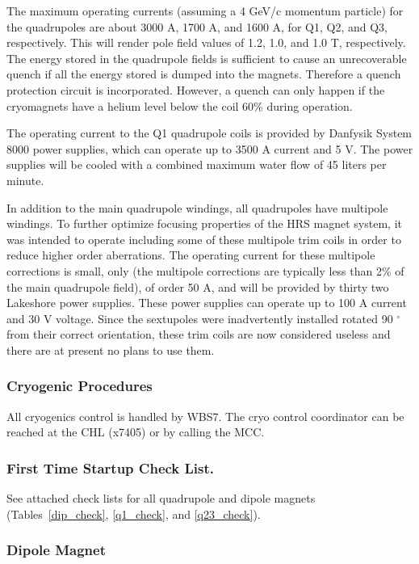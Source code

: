 The maximum operating currents (assuming a 4 GeV/c momentum particle) 
for the quadrupoles are about 3000 A, 1700 A, and 1600 A, for Q1, Q2, and 
Q3, respectively.  This will render pole field values 
of 1.2, 1.0, and 1.0 T, respectively.  The energy stored in the 
quadrupole fields is sufficient to cause an unrecoverable quench if all 
the energy stored is dumped into the magnets.  Therefore a quench 
protection circuit is incorporated.  However, a quench can only happen 
if the cryomagnets have a helium level below the coil 60\% during operation.

The operating current to the Q1 quadrupole coils is provided by Danfysik 
System 8000 power supplies, which can operate up to 3500 A current and 5 
V.  The power supplies will be cooled with a combined maximum 
water flow of 45 liters per minute.

In addition to the main quadrupole windings, all quadrupoles have 
multipole windings.  To further optimize focusing properties of the HRS 
magnet system, it was intended to operate including some of these multipole 
trim coils in order to reduce higher order aberrations.
The operating current for these multipole corrections is 
small, only (the multipole corrections are typically less than 2\% of 
the main quadrupole field), of order 50 A, and will be provided by 
thirty two Lakeshore power supplies.  These power supplies can operate up to 
100 A current and 30 V voltage. Since the sextupoles were inadvertently 
installed rotated 90 $^\circ$ from their correct
orientation, these trim coils are now considered useless 
and there are at present no plans to use them.

\subsubsection{Cryogenic Procedures}

All cryogenics control is handled by WBS7.  The cryo control coordinator 
can be reached at the CHL (x7405) or by calling the MCC.

\subsubsection{First Time Startup Check List.}  

See attached check lists for all quadrupole and dipole magnets
 (Tables~\ref{dip_check}, \ref{q1_check}, and \ref{q23_check}).

\subsubsection{Dipole Magnet}

